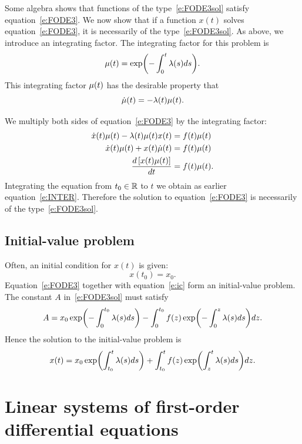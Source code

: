 \documentclass[letterpaper, 11pt, leqno]{article}
\begin{document}
Some algebra shows that functions of the type~\eqref{e:FODE3sol} satisfy equation~\eqref{e:FODE3}. We now show that if a function $x(t)$ solves equation~\eqref{e:FODE3}, it is necessarily of the type~\eqref{e:FODE3sol}. As above, we introduce an integrating factor. The integrating factor for this problem is
\begin{equation*}
\m(t) =\exp{-\int_{0}^{t}\l(s) ds}.
\end{equation*}
This integrating factor $\mu(t)$ has the desirable property that 
\begin{equation*}
\dot{\mu}(t) =-\lambda(t) \mu(t).
\end{equation*}

We multiply both sides of equation~\eqref{e:FODE3} by the integrating factor:
\begin{align*}
\dot{x}(t) \m(t) -\l(t) \m(t) x(t)& =f(t) \m(t)\\
\dot{x}(t) \m(t) +x(t) \dot{\m}(t) &=f(t) \m(t)\\
\od{\bs{x(t) \m(t)}}{t}& =f(t) \m(t).
\end{align*}
Integrating the equation from $t_{0}\in \mathbb{R}$ to $t$ we obtain as earlier equation~\eqref{e:INTER}. Therefore the solution to equation~\eqref{e:FODE3} is necessarily of the type~\eqref{e:FODE3sol}.

\subsection{Initial-value problem}

Often, an initial condition for $x(t)$ is given:
\begin{equation}
x(t_{0}) = x_{0}. \label{e:ic}
\end{equation}
Equation~\eqref{e:FODE3} together with equation~\eqref{e:ic} form an initial-value problem. The constant $A$ in~\eqref{e:FODE3sol} must satisfy
\begin{equation*}
A=x_{0}\exp{-\int_{0}^{t_{0}}\l(s)ds}-\int_{0}^{t_{0}}f(z) \exp{-\int_{0}^{z}\l(s)ds} dz.
\end{equation*}
Hence the solution to the initial-value problem is
\begin{equation}
x(t) =x_{0}\exp{\int_{t_{0}}^{t}\l(s)ds}+\int_{t_{0}}^{t}f(z)\exp{\int_{z}^{t}\l(s)ds}dz.\label{e:icsol}
\end{equation}

\section{Linear systems of first-order differential equations}\label{s:two}
\end{document}
